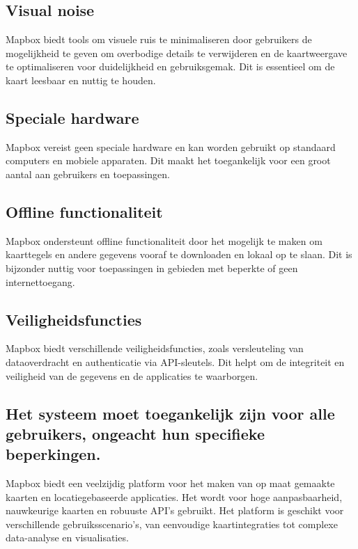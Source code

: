 \subsection*{Visual noise}
Mapbox biedt tools om visuele ruis te minimaliseren door gebruikers de mogelijkheid te geven om overbodige details te verwijderen en de kaartweergave te optimaliseren voor duidelijkheid en gebruiksgemak. Dit is essentieel om de kaart leesbaar en nuttig te houden.

\subsection*{Speciale hardware}
Mapbox vereist geen speciale hardware en kan worden gebruikt op standaard computers en mobiele apparaten. Dit maakt het toegankelijk voor een groot aantal aan gebruikers en toepassingen.

\subsection*{Offline functionaliteit}
Mapbox ondersteunt offline functionaliteit door het mogelijk te maken om kaarttegels en andere gegevens vooraf te downloaden en lokaal op te slaan. Dit is bijzonder nuttig voor toepassingen in gebieden met beperkte of geen internettoegang.


\subsection*{Veiligheidsfuncties}
Mapbox biedt verschillende veiligheidsfuncties, zoals versleuteling van dataoverdracht en authenticatie via API-sleutels. Dit helpt om de integriteit en veiligheid van de gegevens en de applicaties te waarborgen.


\subsection*{Het systeem moet toegankelijk zijn voor alle gebruikers, ongeacht hun specifieke beperkingen.}
Mapbox biedt een veelzijdig platform voor het maken van op maat gemaakte kaarten en locatiegebaseerde applicaties. Het wordt voor hoge aanpasbaarheid, nauwkeurige kaarten en robuuste API's gebruikt. Het platform is geschikt voor verschillende gebruiksscenario's, van eenvoudige kaartintegraties tot complexe data-analyse en visualisaties.
